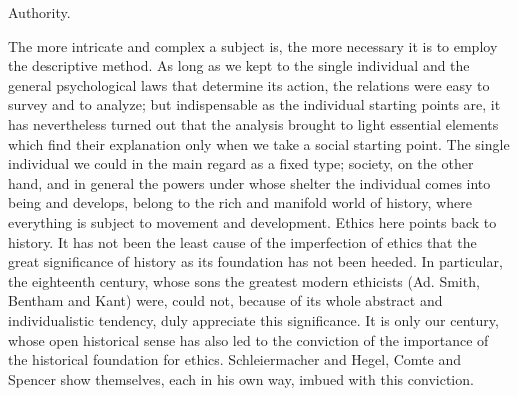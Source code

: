 \documentclass[12pt,a4paper,openany]{book}
\newcommand{\opage}[1]{\marginnote{\footnotesize\textit{[#1]}}}
\newcommand{\chap}[1]{\clearpage\addcontentsline{toc}{chapter}{#1}\vspace*{2em}\begin{center}{\large #1}\end{center}\medskip}
\begin{document}
\chap{Authority.}
\opage{55}The more intricate and complex a subject is, the more necessary it
is to employ the descriptive method. As long as we kept to the single
individual and the general psychological laws that determine its action, the
relations were easy to survey and to analyze; but indispensable as the
individual starting points are, it has nevertheless turned out that the
analysis brought to light essential elements which find their explanation only
when we take a social starting point. The single individual we could in the
main regard as a fixed type; society, on the other hand, and in general the
powers under whose shelter the individual comes into being and develops,
belong to the rich and manifold world of history, where everything is subject
to movement and development. Ethics here points back to history. It has not
been the least cause of the imperfection of ethics that the great significance
of history as its foundation has not been heeded. In particular, the
eighteenth \opage{56}century, whose sons the greatest modern ethicists (Ad.
Smith, Bentham and Kant) were, could not, because of its whole abstract and
individualistic tendency, duly appreciate this significance. It is only our
century, whose open historical sense has also led to the conviction of the
importance of the historical foundation for ethics. Schleiermacher and Hegel,
Comte and Spencer show themselves, each in his own way, imbued with this
conviction.
\end{document}
